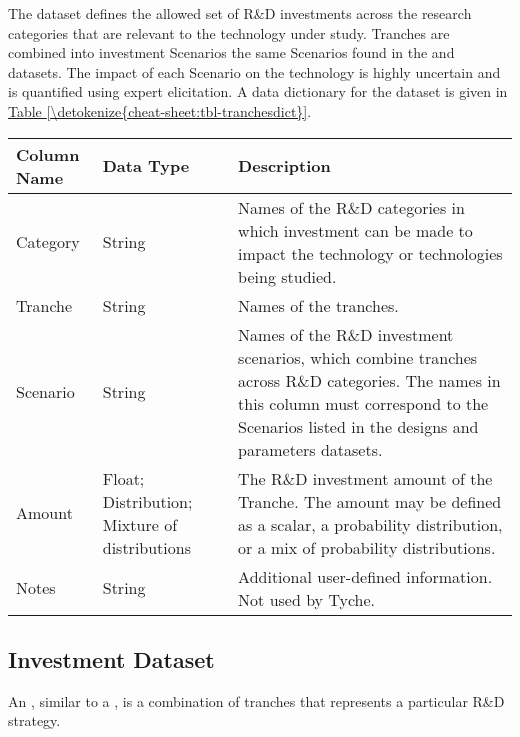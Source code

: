 \documentclass[letterpaper,10pt,english]{sphinxmanual}
\begin{document}
The  dataset defines the allowed set of R\&D investments across the research categories that are relevant to the technology under study. Tranches are combined into investment Scenarios \textendash{} the same Scenarios found in the  and  datasets. The impact of each Scenario on the technology is highly uncertain and is quantified using expert elicitation. A data dictionary for the  dataset is given in \hyperref[\detokenize{cheat-sheet:tbl-tranchesdict}]{Table \ref{\detokenize{cheat-sheet:tbl-tranchesdict}}}.


\begin{savenotes}\sphinxattablestart
\centering
{}
\sphinxthecaptionisattop
{}\label{\detokenize{cheat-sheet:table-5}}\label{\detokenize{cheat-sheet:tbl-tranchesdict}}
\sphinxaftertopcaption
\begin{tabulary}{\linewidth}[t]{|T|T|T|}
\hline
\sphinxstyletheadfamily 
Column Name
&\sphinxstyletheadfamily 
Data Type
&\sphinxstyletheadfamily 
Description
\\
\hline
Category
&
String
&
Names of the R\&D categories in which investment can be made to impact the technology or technologies being studied.
\\
\hline
Tranche
&
String
&
Names of the tranches.
\\
\hline
Scenario
&
String
&
Names of the R\&D investment scenarios, which combine tranches across R\&D categories. The names in this column must correspond to the Scenarios listed in the designs and parameters datasets.
\\
\hline
Amount
&
Float; Distribution; Mixture of distributions
&
The R\&D investment amount of the Tranche. The amount may be defined as a scalar, a probability distribution, or a mix of probability distributions.
\\
\hline
Notes
&
String
&
Additional user-defined information. Not used by Tyche.
\\
\hline
\end{tabulary}
\par
\sphinxattableend\end{savenotes}


\subsection{Investment Dataset}
\label{\detokenize{cheat-sheet:investment-dataset}}
An , similar to a , is a combination of tranches that represents a particular R\&D strategy.
\end{document}
